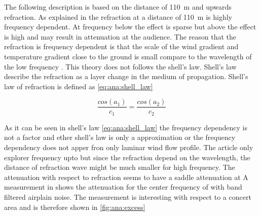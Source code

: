 

The following description is based on the distance of \SI{110}{\meter} and upwards refraction. As explained in \citep{review_of_sound} the refraction at a distance of \SI{110}{\meter} is highly frequency dependent. At frequency below  the effect is sparse but above the effect is high and may result in  attenuation at the audience. The reason that the refraction is frequency dependent is that the scale of the wind gradient and temperature gradient close to the ground is small compare to the wavelength of the low frequency \citep{review_of_sound}. This theory does not follows the shell's law. Shell's law describe the refraction as a layer change in the medium of propagation. Shell's law of refraction is defined as \autoref{eq:ana:shell_law}

\begin{equation}\label{eq:ana:shell_law}
\frac{cos(a_1)}{c_1} = \frac{cos(a_2)}{c_2}
\end{equation}

\startexplain
{}
\stopexplain

As it can be seen in shell's law \autoref{eq:ana:shell_law} the frequency dependency is not a factor and ether shell's law is only a approximation or the frequency dependency does not apper fron only laminar wind flow profile. The article \citep{review_of_sound} only explorer frequency upto  but since the refraction depend on the wavelength, the distance of refraction wave might be much smaller for high frequency. The attenuation with respect to refraction seems to have a saddle attenuation at  A measurement in \citep{review_of_sound} shows the attenuation for the center frequency of  with  band filtered airplain noise. The measurement is interesting with respect to a concert area and is therefore shown in \autoref{fig:ana:excess} 



